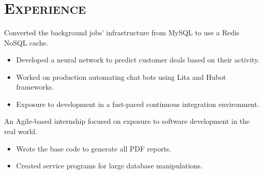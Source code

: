 \begin{resume}
\begin{formatb}
  \\
  \\
  \body\\
\end{formatb}

\section{\textsc{Experience}}
\begin{position}
  Converted the background jobs' infrastructure from MySQL to use a Redis NoSQL cache.
\begin{itemize}
\item Developed a neural network to predict customer deals based on their activity.
\end{itemize}
\begin{itemize}
\item Worked on production automating chat bots using Lita and Hubot frameworks.
\end{itemize}
\begin{itemize}
\item Exposure to development in a fast-paced continuous integration environment.
\end{itemize}
\end{position}

\begin{position}
  An Agile-based internship focused on exposure to software development in the real world. 
\begin{itemize}
\item Wrote the base code to generate all PDF reports.
\end{itemize}
\begin{itemize}
\item Created service programs for large database manipulations.
\end{itemize}
\end{position}

\begin{formatb}
  \\
  \body\\
\end{formatb}


\end{resume}
